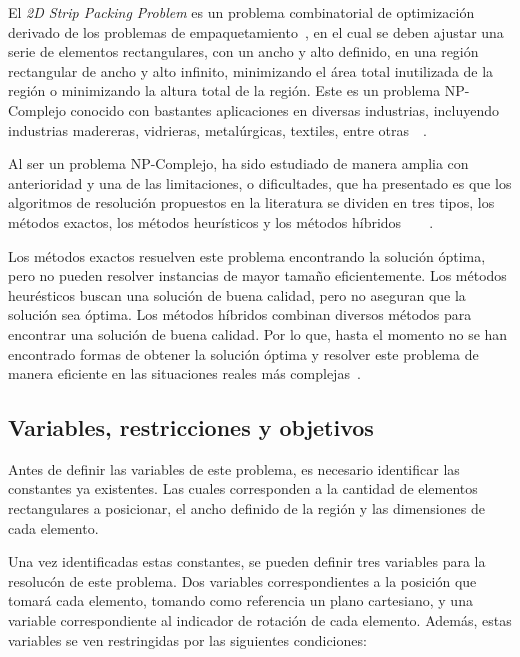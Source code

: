 \documentclass[letter, 10pt]{article}
\begin{document}
El \emph{2D Strip Packing Problem} es un problema combinatorial de optimizaci\'on derivado de los problemas de empaquetamiento~\cite{oliveira2016survey}, en el cual se deben ajustar una serie de elementos rectangulares, con un ancho y alto definido, en una regi\'on rectangular de ancho y alto infinito, minimizando el \'area total inutilizada de la regi\'on o minimizando la altura total de la regi\'on. Este es un problema NP-Complejo conocido con bastantes aplicaciones en diversas industrias, incluyendo industrias madereras, vidrieras, metal\'urgicas, textiles, entre otras~\cite{lodi2002two}~\cite{vasilyev2023generalized}.

Al ser un problema NP-Complejo, ha sido estudiado de manera amplia con anterioridad y una de las limitaciones, o dificultades, que ha presentado es que los algoritmos de resoluci\'on propuestos en la literatura se dividen en tres tipos, los m\'etodos exactos, los m\'etodos heur\'isticos y los m\'etodos h\'ibridos~\cite{he2013heuristics}~\cite{junior2023framework}~\cite{oliveira2016survey}~\cite{wei2017improved}.

Los m\'etodos exactos resuelven este problema encontrando la soluci\'on \'optima, pero no pueden resolver instancias de mayor tama\~no eficientemente. Los m\'etodos heur\'esticos buscan una soluci\'on de buena calidad, pero no aseguran que la soluci\'on sea \'optima. Los m\'etodos h\'ibridos combinan diversos m\'etodos para encontrar una soluci\'on de buena calidad. Por lo que, hasta el momento no se han encontrado formas de obtener la soluci\'on \'optima y resolver este problema de manera eficiente en las situaciones reales m\'as complejas~\cite{thomas2013hybrid}.

\subsection{Variables, restricciones y objetivos}

Antes de definir las variables de este problema, es necesario identificar las constantes ya existentes. Las cuales corresponden a la cantidad de elementos rectangulares a posicionar, el ancho definido de la regi\'on y las dimensiones de cada elemento.

Una vez identificadas estas constantes, se pueden definir tres variables para la resoluc\'on de este problema. Dos variables correspondientes a la posici\'on que tomar\'a cada elemento, tomando como referencia un plano cartesiano, y una variable correspondiente al indicador de rotaci\'on de cada elemento. Adem\'as, estas variables se ven restringidas por las siguientes condiciones:
\end{document}
